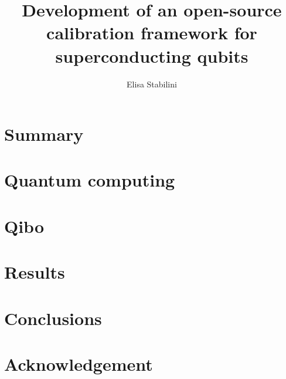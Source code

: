 \documentclass{book}
\title{Development of an open-source calibration framework for superconducting qubits}
\author{Elisa Stabilini}
\date{}
\begin{document}
\frontmatter


\clearpage

\clearpage
\tableofcontents
\clearpage


\chapter*{Summary}

\mainmatter
\chapter{Quantum computing}
\chapter{Qibo}
\chapter{Results}
%
\chapter{Conclusions}
%




\backmatter
\printbibliography

\chapter*{Acknowledgement}

\end{document}
